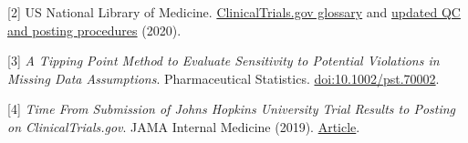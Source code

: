 \documentclass[11pt]{article}
\begin{document}
[2] US National Library of Medicine. \href{https://clinicaltrials.gov/study-basics/glossary}{ClinicalTrials.gov glossary} and \href{https://www.nlm.nih.gov/pubs/techbull/jf20/jf20_clinicaltrials_qc.html}{updated QC and posting procedures} (2020).

[3] \emph{A Tipping Point Method to Evaluate Sensitivity to Potential Violations in Missing Data Assumptions}. Pharmaceutical Statistics. \href{https://doi.org/10.1002/pst.70002}{doi:10.1002/pst.70002}.

[4] \emph{Time From Submission of Johns Hopkins University Trial Results to Posting on ClinicalTrials.gov}. JAMA Internal Medicine (2019). \href{https://jamanetwork.com/journals/jamainternalmedicine/fullarticle/2753423}{Article}.
\end{document}
